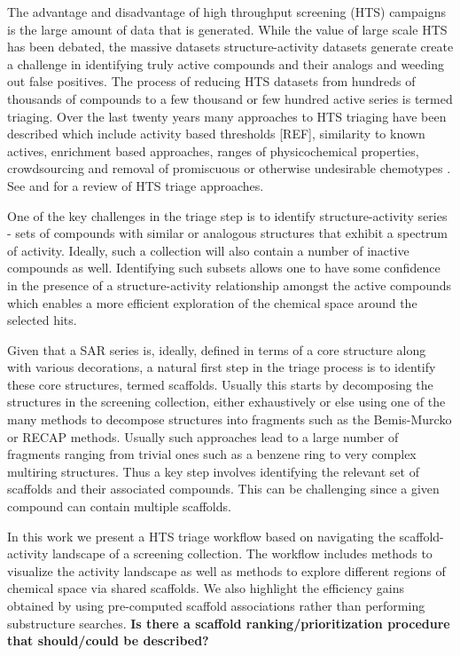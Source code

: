 \documentclass[journal=jacsat,manuscript=article]{achemso}
\begin{document}
The advantage and disadvantage of high throughput screening (HTS) campaigns is the large amount of data that is generated. While the value of large scale HTS has been debated\cite{Macarron:2011qv}, the massive datasets structure-activity datasets generate create a  challenge in identifying truly active compounds and their analogs and weeding out false positives. The process of reducing HTS datasets from hundreds of thousands of compounds to a few thousand or few hundred active series is termed triaging. Over the last twenty years many approaches to HTS triaging have been described which include activity based thresholds [REF], similarity to known actives, enrichment based approaches\cite{Varin2010CSE,Pu:2012wf}, ranges of physicochemical properties\cite{Cox:2012qy}, crowdsourcing\cite{Peng:2013qp}  and removal of promiscuous or otherwise undesirable chemotypes \cite{Dahlin:2014fp}. See \citeauthor{Shun:2011sy}  and \citeauthor{Langer:2009mw} for a review of HTS triage approaches.

One of the key challenges in the triage step is to identify structure-activity series - sets of compounds with similar or analogous structures that exhibit a spectrum of activity. Ideally, such a collection will also contain a number of inactive compounds as well. Identifying such subsets allows one to have some confidence in the presence of a structure-activity relationship amongst the active compounds which enables a more efficient exploration of the chemical space around the selected hits.

Given that a SAR series is, ideally, defined in terms of a core structure along with various decorations, a natural first step in the triage process is to identify these core structures, termed scaffolds. Usually this starts by decomposing the structures in the screening collection, either exhaustively or else using one of the many methods to decompose structures into fragments such as the Bemis-Murcko\cite{BemisMurcko1999,BemisMurcko1996} or RECAP methods\cite{Lewell:1998aa}. Usually such approaches lead to a large number of fragments ranging from trivial ones such as a benzene ring to very complex multiring structures. Thus a key step involves identifying the relevant set of scaffolds and their associated compounds. This can be challenging since a given compound can contain multiple scaffolds.

In this work we present a HTS triage workflow based on navigating the scaffold-activity landscape of a screening collection. The workflow includes methods to visualize the activity landscape as well as methods to explore different regions of chemical space via shared scaffolds. We also highlight the efficiency gains obtained by using pre-computed scaffold associations rather than performing substructure searches. \textbf{Is there a scaffold ranking/prioritization procedure that should/could be described?}
\end{document}
